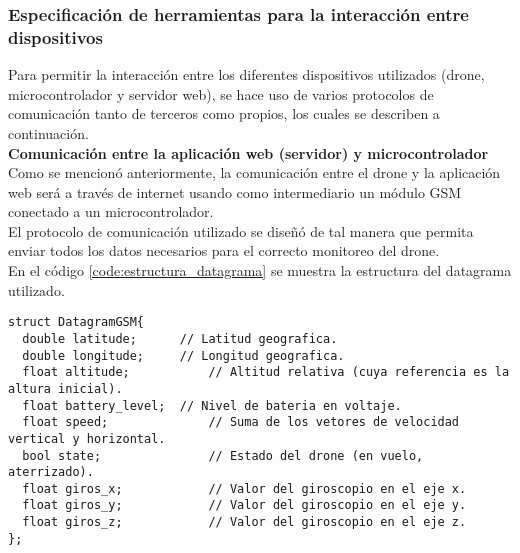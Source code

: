 
\subsubsection{Especificación de herramientas para la interacción entre dispositivos}

Para permitir la interacción entre los diferentes dispositivos utilizados (drone, microcontrolador y servidor web), se hace uso de varios protocolos de comunicación tanto de terceros como propios, los cuales se describen a continuación. \\



\textbf{Comunicación entre la aplicación web (servidor) y microcontrolador} \\
Como se mencionó anteriormente, la comunicación entre el drone y la aplicación web será a través de internet usando como intermediario un módulo GSM conectado a un microcontrolador. \\
El protocolo de comunicación utilizado se diseñó de tal manera que permita enviar todos los datos necesarios para el correcto monitoreo del drone. \\
En el código \ref{code:estructura_datagrama} se muestra la estructura del datagrama utilizado.\\

\begin{lstlisting}[caption={Estructura del protocolo de comunicación entre la aplicación web y el microcontrolador.},captionpos=b,label=code:estructura_datagrama]
struct DatagramGSM{
  double latitude;		// Latitud geografica.
  double longitude;		// Longitud geografica.
  float altitude;			// Altitud relativa (cuya referencia es la altura inicial).
  float battery_level;	// Nivel de bateria en voltaje.
  float speed;				// Suma de los vetores de velocidad vertical y horizontal.
  bool state;				// Estado del drone (en vuelo, aterrizado).
  float giros_x;			// Valor del giroscopio en el eje x.
  float giros_y;			// Valor del giroscopio en el eje y.
  float giros_z;			// Valor del giroscopio en el eje z.
};
\end{lstlisting}

